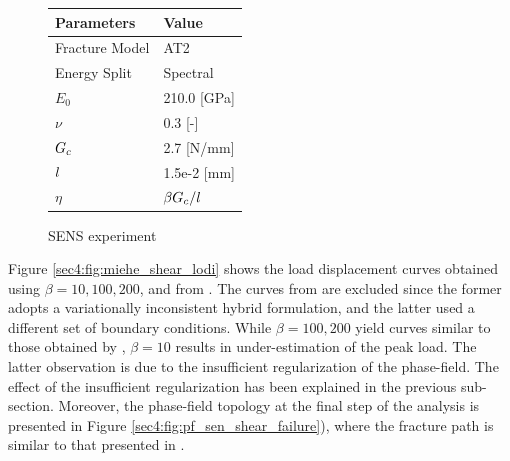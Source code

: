 \documentclass[11pt]{article}
\begin{document}
\begin{figure}[ht]
\begin{minipage}[b]{0.45\linewidth}
\caption{SENS experiment}
\label{sec4:fig:miehe_shear}
\end{minipage}
\begin{minipage}[b]{0.45\linewidth}
\centering
\begin{tabular}{ll} \hline
  \textbf{Parameters} & \textbf{Value} \\ \hline
  Fracture Model & AT2 \\
  Energy Split & Spectral \\
  $E_0$ & 210.0 [GPa] \\
  $\nu$ & 0.3 [-] \\
  $\hbox{$G_c$}$ & 2.7 [N/mm] \\
  $\hbox{$l$}$ & 1.5e-2 [mm] \\
  $\eta$ & $\beta \hbox{$G_c$}/\hbox{$l$}$ \\ \hline
  \end{tabular}
\label{sec4:table:miehe_shear}
\end{minipage}
\end{figure}

Figure \ref{sec4:fig:miehe_shear_lodi} shows the load displacement curves obtained using $\beta = 10, 100, 200$, and from \cite{Miehe2010}. The curves from \cite{Ambati2015,KRISTENSEN2020102446} are excluded since the former adopts a variationally inconsistent hybrid formulation, and the latter used a different set of boundary conditions. While $\beta = 100, 200$ yield curves similar to those obtained by \cite{Miehe2010}, $\beta = 10$ results in under-estimation of the peak load. The latter observation is due to the insufficient regularization of the phase-field. The effect of the insufficient regularization has been explained in the previous sub-section. Moreover, the phase-field topology at the final step of the analysis is presented in Figure \ref{sec4:fig:pf_sen_shear_failure}), where the fracture path is similar to that presented in \cite{Miehe2010}. 
\end{document}
